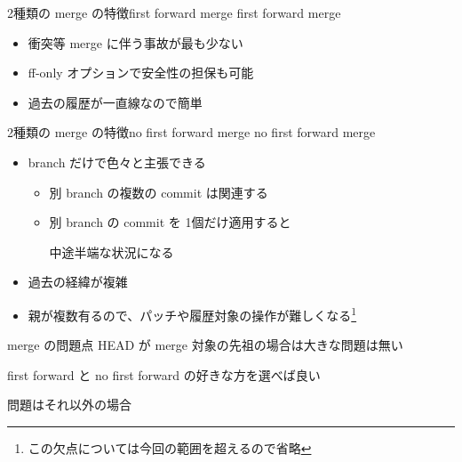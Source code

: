 \begin{frame}[t]{2種類の merge の特徴}{first forward merge}
  first forward merge
  \vspace{2ex}

  \begin{itemize}
  \item 衝突等 merge に伴う事故が最も少ない
    \vspace{2ex}

  \item {\dhyphen}ff-only オプションで安全性の担保も可能
    \vspace{2ex}

  \item 過去の履歴が一直線なので簡単
  \end{itemize}
  \vspace{2ex}
\end{frame}


\begin{frame}[t]{2種類の merge の特徴}{no first forward merge}
  no first forward merge
  \vspace{2ex}

  \begin{itemize}
  \item branch だけで色々と主張できる
    \begin{itemize}
    \item 別 branch の複数の commit は関連する
    \item 別 branch の commit を 1個だけ適用すると

      中途半端な状況になる
    \end{itemize}
    \vspace{2ex}

  \item 過去の経緯が複雑
    \vspace{2ex}

  \item 親が複数有るので、パッチや履歴対象の操作が難しくなる\footnote{この欠点については今回の範囲を超えるので省略}
  \end{itemize}
\end{frame}


\begin{frame}[t]{merge の問題点}{}
  HEAD が merge 対象の先祖の場合は大きな問題は無い

  first forward と no first forward の好きな方を選べば良い
  \vspace{2ex}

  問題はそれ以外の場合

  \vspace{2ex}


\end{frame}

